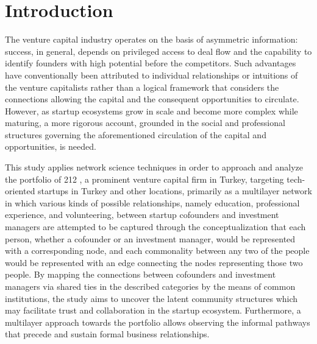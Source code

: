\documentclass[conference]{IEEEtran}
\begin{document}
\section{Introduction}
The venture capital industry operates on the basis of asymmetric information: success, in general, depends on privileged access to deal flow and the capability to identify founders with high potential before the competitors. Such advantages have conventionally been attributed to individual relationships or intuitions of the venture capitalists rather than a logical framework that considers the connections allowing the capital and the consequent opportunities to circulate. However, as startup ecosystems grow in scale and become more complex while maturing, a more rigorous account, grounded in the social and professional structures governing the aforementioned circulation of the capital and opportunities, is needed.

This study applies network science techniques in order to approach and analyze the portfolio of 212 \cite{212website}, a prominent venture capital firm in Turkey, targeting tech-oriented startups in Turkey and other locations, primarily as a multilayer network in which various kinds of possible relationships, namely education, professional experience, and volunteering, between startup cofounders and investment managers are attempted to be captured through the conceptualization that each person, whether a cofounder or an investment manager, would be represented with a corresponding node, and each commonality between any two of the people would be represented with an edge connecting the nodes representing those two people. By mapping the connections between cofounders and investment managers via shared ties in the described categories by the means of common institutions, the study aims to uncover the latent community structures which may facilitate trust and collaboration in the startup ecosystem. Furthermore, a multilayer approach towards the portfolio allows observing the informal pathways that precede and sustain formal business relationships.
\end{document}
